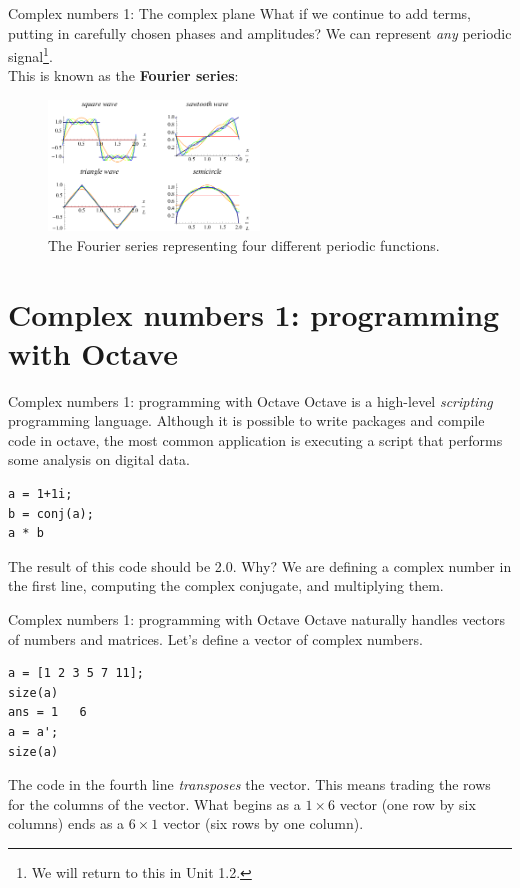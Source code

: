 \documentclass{beamer}
\begin{document}
\begin{frame}{Complex numbers 1: The complex plane}
\small
What if we continue to add terms, putting in carefully chosen phases and amplitudes?  We can represent \textit{any} periodic signal\footnote{We will return to this in Unit 1.2.}.  \\ \vspace{0.5cm}
This is known as the \textbf{\alert{Fourier series}}:
\begin{figure}
\centering
\includegraphics[width=0.5\textwidth]{figures/Fourier_Series.png}
\caption{\label{fig:fourier} The Fourier series representing four different periodic functions.}
\end{figure}
\end{frame}

\section{Complex numbers 1: programming with Octave}

\begin{frame}[fragile]{Complex numbers 1: programming with Octave}
Octave is a high-level \textit{scripting} programming language.  Although it is possible to write packages and compile code in octave, the most common application is executing a script that performs some analysis on digital data. \\
\begin{verbatim}
a = 1+1i;
b = conj(a);
a * b
\end{verbatim}
The result of this code should be 2.0.  Why?  We are defining a complex number in the first line, computing the complex conjugate, and multiplying them.
\end{frame}

\begin{frame}[fragile]{Complex numbers 1: programming with Octave}
Octave naturally handles vectors of numbers and matrices.  Let's define a vector of complex numbers. \\
\begin{verbatim}
a = [1 2 3 5 7 11];
size(a)
ans = 1   6
a = a';
size(a)
\end{verbatim}
The code in the fourth line \textit{transposes} the vector.  This means trading the rows for the columns of the vector.  What begins as a $1 \times 6$ vector (one row by six columns) ends as a $6 \times 1$ vector (six rows by one column).
\end{frame}
\end{document}
